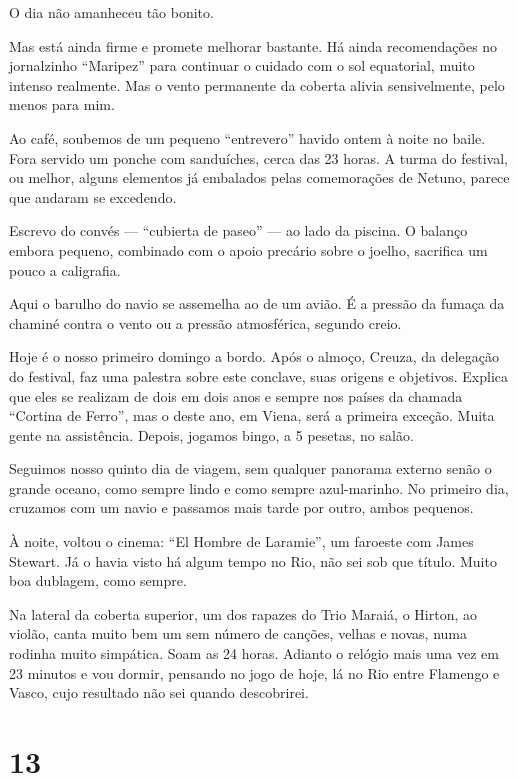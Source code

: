 O dia não amanheceu tão bonito.

Mas está ainda firme e promete melhorar bastante. Há ainda recomendações no jornalzinho ``Maripez'' para continuar o cuidado com o sol equatorial, muito intenso realmente. Mas o vento permanente da coberta alivia sensivelmente, pelo menos para mim.

Ao café, soubemos de um pequeno ``entrevero'' havido ontem à noite no baile. Fora servido um ponche com sanduíches, cerca das 23 horas. A turma do festival, ou melhor, alguns elementos já embalados pelas comemorações de Netuno, parece que andaram se excedendo.

Escrevo do convés --- ``cubierta de paseo'' --- ao lado da piscina. O balanço embora pequeno, combinado com o apoio precário sobre o joelho, sacrifica um pouco a caligrafia.

Aqui o barulho do navio se assemelha ao de um avião. É a pressão da fumaça da chaminé contra o vento ou a pressão atmosférica, segundo creio.

Hoje é o nosso primeiro domingo a bordo. Após o almoço, Creuza, da delegação do festival, faz uma palestra sobre este conclave, suas origens e objetivos. Explica que eles se realizam de dois em dois anos e sempre nos países da chamada ``Cortina de Ferro'', mas o deste ano, em Viena, será a primeira exceção. Muita gente na assistência. Depois, jogamos bingo, a 5 pesetas, no salão.

Seguimos nosso quinto dia de viagem, sem qualquer panorama externo senão o grande oceano, como sempre lindo e como sempre azul-marinho. No primeiro dia, cruzamos com um navio e passamos mais tarde por outro, ambos pequenos.

À noite, voltou o cinema: ``El Hombre de Laramie'', um faroeste com James Stewart. Já o havia visto há algum tempo no Rio, não sei sob que título. Muito boa dublagem, como sempre.

Na lateral da coberta superior, um dos rapazes do Trio Maraiá, o Hirton, ao violão, canta muito bem um sem número de canções, velhas e novas, numa rodinha muito simpática. Soam as 24 horas. Adianto o relógio mais uma vez em 23 minutos e vou dormir, pensando no jogo de hoje, lá no Rio entre Flamengo e Vasco, cujo resultado não sei quando descobrirei.

\section*{13 \adfflatleafright {}}

